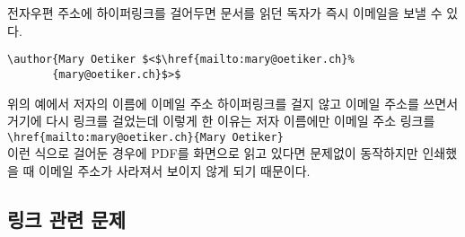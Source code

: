 전자우편 주소에 하이퍼링크를 걸어두면 문서를 읽던 독자가 즉시 이메일을 보낼 수 있다. 
\begin{code}
\begin{verbatim}
\author{Mary Oetiker $<$\href{mailto:mary@oetiker.ch}%
       {mary@oetiker.ch}$>$
\end{verbatim}
\end{code}
위의 예에서 저자의 이름에 이메일 주소 하이퍼링크를 걸지 않고 이메일 주소를 쓰면서 거기에 다시 링크를 걸었는데 이렇게 한 이유는 저자 이름에만 이메일 주소 링크를 \\
\verb+\href{mailto:mary@oetiker.ch}{Mary Oetiker}+\\
이런 식으로 걸어둔 경우에 PDF를 화면으로 읽고 있다면 문제없이 동작하지만 인쇄했을 때 이메일 주소가 사라져서 보이지 않게 되기 때문이다.

\subsection{링크 관련 문제}

